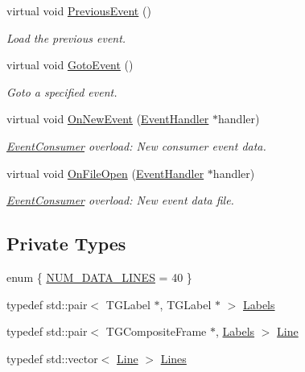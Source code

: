 \begin{DoxyCompactItemize}
virtual void \hyperlink{class_d_d4hep_1_1_event_control_aa313ad37f6a3a7b3d5a26abb37c051d3}{Previous\+Event} ()
\begin{DoxyCompactList}\small\item\em Load the previous event. \end{DoxyCompactList}\item 
virtual void \hyperlink{class_d_d4hep_1_1_event_control_a4804b629feb785168b1ddb18592587bb}{Goto\+Event} ()
\begin{DoxyCompactList}\small\item\em Goto a specified event. \end{DoxyCompactList}\item 
virtual void \hyperlink{class_d_d4hep_1_1_event_control_af3644b3a91372e313440eaca8cf893c2}{On\+New\+Event} (\hyperlink{class_d_d4hep_1_1_event_handler}{Event\+Handler} $\ast$handler)
\begin{DoxyCompactList}\small\item\em \hyperlink{class_d_d4hep_1_1_event_consumer}{Event\+Consumer} overload\+: New consumer event data. \end{DoxyCompactList}\item 
virtual void \hyperlink{class_d_d4hep_1_1_event_control_a651a44af5e16dd7c9f98e3ccec5971a2}{On\+File\+Open} (\hyperlink{class_d_d4hep_1_1_event_handler}{Event\+Handler} $\ast$handler)
\begin{DoxyCompactList}\small\item\em \hyperlink{class_d_d4hep_1_1_event_consumer}{Event\+Consumer} overload\+: New event data file. \end{DoxyCompactList}\end{DoxyCompactItemize}
\subsection*{Private Types}
\begin{DoxyCompactItemize}
\item 
enum \{ \hyperlink{class_d_d4hep_1_1_event_control_a9a7c581934b4dff35b3753b630b15f74a0e8834462de33571d882f9225d1ca704}{N\+U\+M\+\_\+\+D\+A\+T\+A\+\_\+\+L\+I\+N\+ES} = 40
 \}
\item 
typedef std\+::pair$<$ T\+G\+Label $\ast$, T\+G\+Label $\ast$ $>$ \hyperlink{class_d_d4hep_1_1_event_control_a12b653cc77607d8916f8a5ec009036ed}{Labels}
\item 
typedef std\+::pair$<$ T\+G\+Composite\+Frame $\ast$, \hyperlink{class_d_d4hep_1_1_event_control_a12b653cc77607d8916f8a5ec009036ed}{Labels} $>$ \hyperlink{class_d_d4hep_1_1_event_control_a8195e2f8755ede7627abeaaacd0155e2}{Line}
\item 
typedef std\+::vector$<$ \hyperlink{class_d_d4hep_1_1_event_control_a8195e2f8755ede7627abeaaacd0155e2}{Line} $>$ \hyperlink{class_d_d4hep_1_1_event_control_a662fec8b3e1e89af1cf704e41cb7df78}{Lines}
\end{DoxyCompactItemize}
